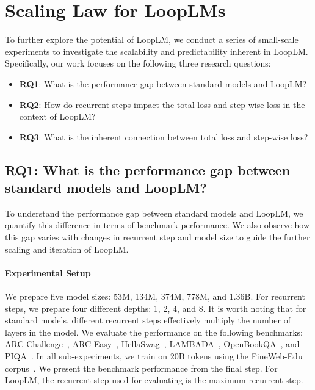 \documentclass[]{bytedance_seed}
\newcommand{\1}{\mathbf{1}}
\newcommand{\ut}{LoopLM}
\begin{document}
{\section{Scaling Law for \ut{}s}

To further explore the potential of \ut{}, we conduct a series of small-scale experiments to investigate the scalability and predictability inherent in \ut{}. Specifically, our work focuses on the following three research questions:

\begin{itemize}[itemsep=0.0pt,topsep=0pt,leftmargin=*]
    \item \textbf{RQ1}: What is the performance gap between standard models and \ut{}?
    \item \textbf{RQ2}: How do recurrent steps impact the total loss and step-wise loss in the context of \ut{}?
    \item \textbf{RQ3}: What is the inherent connection between total loss and step-wise loss?
\end{itemize}


\subsection{RQ1: What is the performance gap between standard models and \ut{}?}
\label{scaling_law_sub_1}

To understand the performance gap between standard models and \ut{}, we quantify this difference in terms of benchmark performance. We also observe how this gap varies with changes in recurrent step and model size to guide the further scaling and iteration of \ut{}.

\paragraph{Experimental Setup} We prepare five model sizes: 53M, 134M, 374M, 778M, and 1.36B. For recurrent steps, we prepare four different depths: 1, 2, 4, and 8. It is worth noting that for standard models, different recurrent steps effectively multiply the number of layers in the model. We evaluate the performance on the following benchmarks: ARC-Challenge~\citep{allenai:arc}, ARC-Easy~\citep{allenai:arc}, HellaSwag~\citep{zellers2019hellaswag}, LAMBADA~\citep{lambada}, OpenBookQA~\citep{mihaylov2018can}, and PIQA~\citep{bisk2020piqa}. In all sub-experiments, we train on 20B tokens using the FineWeb-Edu corpus~\citep{penedo2024fineweb}. We present the benchmark performance from the final step. For \ut{}, the recurrent step used for evaluating is the maximum recurrent step. 

}
\end{document}
